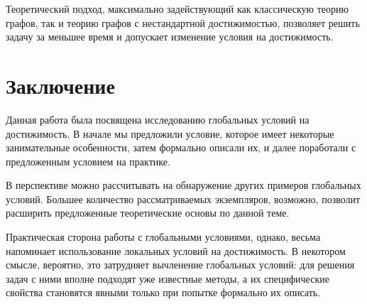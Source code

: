 Теоретический подход, максимально задействующий как классическую теорию графов, так и теорию графов с нестандартной достижимостью, позволяет решить задачу за меньшее время и допускает изменение условия на достижимость. 

\chapter{Заключение}

Данная работа была посвящена исследованию глобальных условий на достижимость. В начале мы предложили условие, которое имеет некоторые занимательные особенности, затем формально описали их, и далее поработали с предложенным условием на практике.

В перспективе можно рассчитывать на обнаружение других примеров глобальных условий. Большее количество рассматриваемых экземпляров, возможно, позволит расширить предложенные теоретические основы по данной теме. 

Практическая сторона работы с глобальными условиями, однако, весьма напоминает использование локальных условий на достижимость. В некотором смысле, вероятно, это затрудняет вычленение глобальных условий: для решения задач с ними вполне подходят уже известные методы, а их специфические свойства становятся явными только при попытке формально их описать.  

\newpage 


